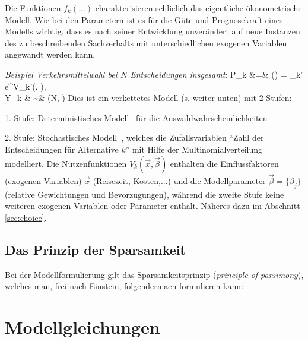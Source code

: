Die Funktionen $f_k(...)$ charakterisieren
schlie\3lich das eigentliche \"okonometrische
Modell. Wie bei den Parametern ist es f\"ur die G\"ute und
Prognosekraft eines Modells wichtig, dass es nach
seiner Entwicklung unver\"andert auf neue Instanzen des zu
beschreibenden Sachverhalts mit unterschiedlichen exogenen Variablen angewandt
werden kann.

\textit{Beispiel Verkehrsmittelwahl bei $N$ Entscheidungen insgesamt}: 
\bea
\label{allg-MNL-P}
P_k &=& () 
  =  
  {\sum_{k'} e^{V_{k'}(, \vec{\beta})}}, \\
\label{allg-MNL}
Y_k & \sim & (N, )
\eea
Dies ist ein verkettetes Modell (s. weiter unten) mit 2 Stufen:
\bi
\item 1. Stufe: Deterministisches Modell~ f\"ur die
Auswahlwahrscheinlichkeiten
\item 2. Stufe: Stochastisches Modell~, welches
die Zufallsvariablen ``Zahl der Entscheidungen f\"ur Alternative $k$''
 mit Hilfe der Multinomialverteilung modelliert.
\ei
Die  Nutzenfunktionen $V_k(\vec{x}, \vec{\beta})$ enthalten die
Einflussfaktoren (exogenen Variablen) $\vec{x}$ (Reisezeit,
Kosten,...) und  die Modellparameter $\vec{\beta}=\{\beta_j\}$
(relative Gewichtungen und Bevorzugungen), w\"ahrend die zweite Stufe
keine weiteren exogenen Variablen oder Parameter enth\"alt.
N\"aheres dazu im Abschnitt
\ref{sec:choice}.

\subsection{Das Prinzip der Sparsamkeit}

Bei der Modellformulierung gilt das Sparsamkeitsprinzip
(\textit{principle of parsimony}), welches man, frei nach Einstein,
folgenderma\3en formulieren kann: 



\section{\label{sec:oekonModgleichungen}Modellgleichungen}

